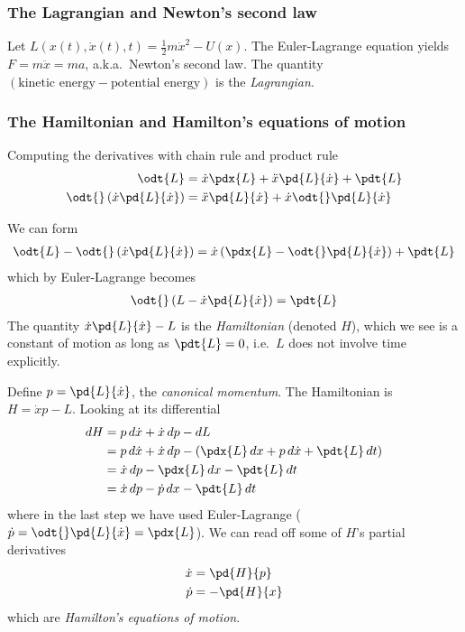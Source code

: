 \documentclass[12pt, oneside, letterpaper, fleqn]{article}
\begin{document}
\subsubsection{The Lagrangian and Newton's second law}
Let $L(x(t), \dot{x}(t), t) = \frac{1}{2}m\dot{x}^2 - U(x)$. The
Euler-Lagrange equation yields $F = m\ddot{x} = ma$, a.k.a.\ Newton's
second law. The quantity $(\text{kinetic energy} - \text{potential
energy})$ is the \emph{Lagrangian}.

\subsubsection{The Hamiltonian and Hamilton's equations of motion}
Computing the derivatives with chain rule and product rule
\begin{align*}
\odt{L} &= \dot{x}\pdx{L} + \ddot{x}\pd{L}{\dot{x}} + \pdt{L}\\
\odt{}\left(\dot{x}\pd{L}{\dot{x}}\right) &= \ddot{x}\pd{L}{\dot{x}} +
\dot{x}\odt{}\pd{L}{\dot{x}}
\end{align*}

We can form
\begin{align*}
\odt{L} - \odt{}\left(\dot{x}\pd{L}{\dot{x}}\right) =
\dot{x}\left(\pdx{L} - \odt{}\pd{L}{\dot{x}}\right) + \pdt{L}
\end{align*}
which by Euler-Lagrange becomes
\begin{align*}
\odt{}\left(L - \dot{x}\pd{L}{\dot{x}}\right) = \pdt{L}
\end{align*}
The quantity $\dot{x}\pd{L}{\dot{x}} - L$ is the
\emph{Hamiltonian} (denoted $H$), which we see is a constant of motion
as long as $\pdt{L} = 0$, i.e.\ $L$ does not involve time explicitly.

Define $p = \pd{L}{\dot{x}}$, the \emph{canonical momentum}. The
Hamiltonian is $H = \dot{x}p - L$. Looking at its differential
\begin{align*}
dH &= p\,d\dot{x} + \dot{x}\,dp - dL\\
&= p\,d\dot{x} + \dot{x}\,dp - \left(\pdx{L}\,dx + p\,d\dot{x} +
\pdt{L}\,dt\right)\\
&= \dot{x}\,dp - \pdx{L}\,dx - \pdt{L}\,dt\\
&= \dot{x}\,dp - \dot{p}\,dx - \pdt{L}\,dt
\end{align*}
where in the last step we have used Euler-Lagrange ($\dot{p} =
\odt{}\pd{L}{\dot{x}} = \pdx{L}$). We can read off some of $H$'s partial
derivatives
\begin{align}\begin{split}\label{eq:hamilton}
\dot{x} &= \pd{H}{p}\\
\dot{p} &= -\pd{H}{x}
\end{split}\end{align}
which are \emph{Hamilton's equations of motion}.
\end{document}
